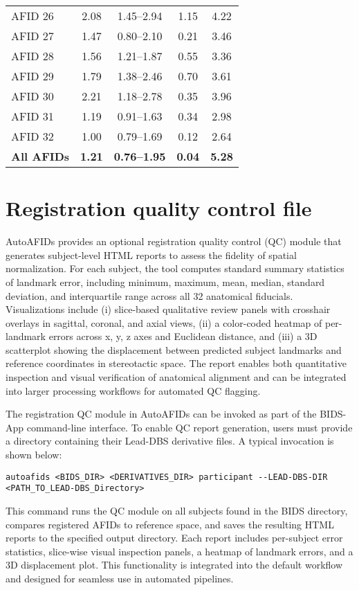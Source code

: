 \begin{table}[H]
\begin{tabular}{lcccc}
AFID 26 & 2.08 & 1.45--2.94 & 1.15 & 4.22 \\
AFID 27 & 1.47 & 0.80--2.10 & 0.21 & 3.46 \\
AFID 28 & 1.56 & 1.21--1.87 & 0.55 & 3.36 \\
AFID 29 & 1.79 & 1.38--2.46 & 0.70 & 3.61 \\
AFID 30 & 2.21 & 1.18--2.78 & 0.35 & 3.96 \\
AFID 31 & 1.19 & 0.91--1.63 & 0.34 & 2.98 \\
AFID 32 & 1.00 & 0.79--1.69 & 0.12 & 2.64 \\
\midrule
\textbf{All AFIDs} & \textbf{1.21} & \textbf{0.76--1.95} & \textbf{0.04} & \textbf{5.28} \\
\bottomrule
\end{tabular}
\end{table}

\newpage
\section{Registration quality control file}
\label{app:registrationqualitycontrol}
AutoAFIDs provides an optional registration quality control (QC) module that generates subject-level HTML reports to assess the fidelity of spatial normalization. For each subject, the tool computes standard summary statistics of landmark error, including minimum, maximum, mean, median, standard deviation, and interquartile range across all 32 anatomical fiducials. Visualizations include (i) slice-based qualitative review panels with crosshair overlays in sagittal, coronal, and axial views, (ii) a color-coded heatmap of per-landmark errors across x, y, z axes and Euclidean distance, and (iii) a 3D scatterplot showing the displacement between predicted subject landmarks and reference coordinates in stereotactic space. The report enables both quantitative inspection and visual verification of anatomical alignment and can be integrated into larger processing workflows for automated QC flagging.

The registration QC module in AutoAFIDs can be invoked as part of the BIDS-App command-line interface. To enable QC report generation, users must provide a directory containing their Lead-DBS derivative files. A typical invocation is shown below:

\begin{verbatim}
autoafids <BIDS_DIR> <DERIVATIVES_DIR> participant --LEAD-DBS-DIR <PATH_TO_LEAD-DBS_Directory>
\end{verbatim}

This command runs the QC module on all subjects found in the BIDS directory, compares registered AFIDs to reference space, and saves the resulting HTML reports to the specified output directory. Each report includes per-subject error statistics, slice-wise visual inspection panels, a heatmap of landmark errors, and a 3D displacement plot. This functionality is integrated into the default workflow and designed for seamless use in automated pipelines.
\newpage
